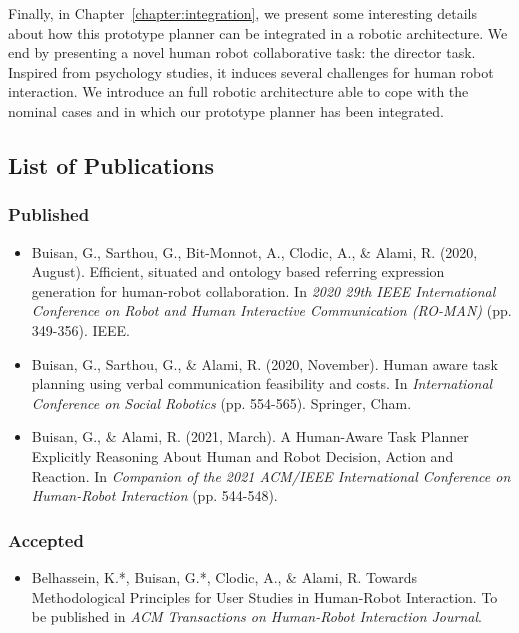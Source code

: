 \documentclass[a4paper,11pt,twoside]{StyleThese}
\begin{document}
Finally, in Chapter~\ref{chapter:integration}, we present some interesting details about how this prototype planner can be integrated in a robotic architecture. We end by presenting a novel human robot collaborative task: the director task. Inspired from psychology studies, it induces several challenges for human robot interaction. We introduce an full robotic architecture able to cope with the nominal cases and in which our prototype planner has been integrated.

\subsection*{List of Publications}
\subsubsection*{Published}
\begin{itemize}
\item Buisan, G., Sarthou, G., Bit-Monnot, A., Clodic, A., \& Alami, R. (2020, August). Efficient, situated and ontology based referring expression generation for human-robot collaboration. In \textit{2020 29th IEEE International Conference on Robot and Human Interactive Communication (RO-MAN)} (pp. 349-356). IEEE.

\item Buisan, G., Sarthou, G., \& Alami, R. (2020, November). Human aware task planning using verbal communication feasibility and costs. In \textit{International Conference on Social Robotics} (pp. 554-565). Springer, Cham.

\item Buisan, G., \& Alami, R. (2021, March). A Human-Aware Task Planner Explicitly Reasoning About Human and Robot Decision, Action and Reaction. In \textit{Companion of the 2021 ACM/IEEE International Conference on Human-Robot Interaction} (pp. 544-548).
\end{itemize}

\subsubsection*{Accepted}
\begin{itemize}
\item Belhassein, K.*, Buisan, G.*, Clodic, A., \& Alami, R. Towards Methodological Principles for User Studies in Human-Robot Interaction. To be published in \textit{ACM Transactions on Human-Robot Interaction Journal}.
\end{itemize}
\end{document}
